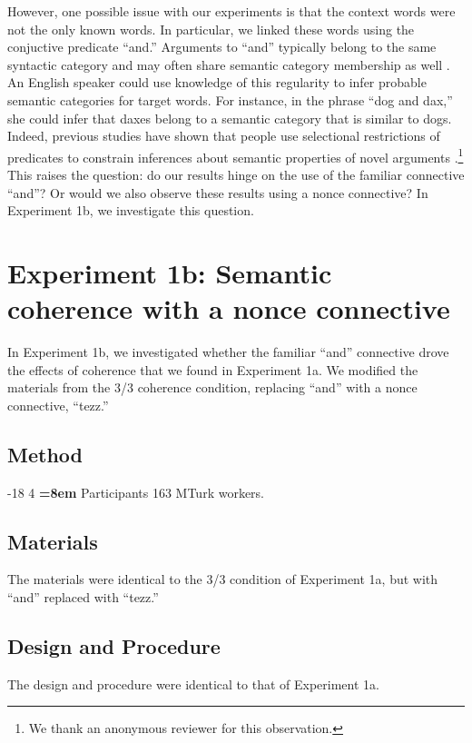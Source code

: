 \documentclass[man,longtable,floatsintext]{my-apa6}
\makeatletter
\renewcommand\subsubsection{\@startsection{subsubsection}{3}{\z@}%
                       {-18\p@ \@plus -4\p@ \@minus -4\p@}%
                       {4\p@ \@plus 2\p@ \@minus 2\p@}%
                       {\normalfont\normalsize\bfseries\boldmath
                        \rightskip=\z@ \@plus 8em\pretolerance=10000 }}
\makeatother
\begin{document}
However, one possible issue with our experiments is that the context words were not the only known words.
In particular, we linked these words using the conjuctive predicate ``and.''
Arguments to ``and'' typically belong to the same syntactic category and may often share semantic category membership as well \cite{benor2006}.
An English speaker could use knowledge of this regularity to infer probable semantic categories for target words.
For instance, in the phrase ``dog and dax,'' she could infer that daxes belong to a semantic category that is similar to dogs.
Indeed, previous studies have shown that people use selectional restrictions of predicates to constrain inferences about semantic properties of novel arguments \citep{altmann1999, kohne2010}.\footnote{We thank an anonymous reviewer for this observation.}
This raises the question: do our results hinge on the use of the familiar connective ``and''?
Or would we also observe these results using a nonce connective?
In Experiment 1b, we investigate this question.

\section{Experiment 1b: Semantic coherence with a nonce connective}

In Experiment 1b, we investigated whether the familiar ``and'' connective drove the effects of coherence that we found in Experiment 1a. We modified the materials from the 3/3 coherence condition, replacing ``and'' with a nonce connective, ``tezz.''

\subsection{Method}

\subsubsection{Participants}
163 MTurk workers.

\subsection{Materials}
The materials were identical to the 3/3 condition of Experiment 1a, but with ``and'' replaced with ``tezz.''

\subsection{Design and Procedure}
The design and procedure were identical to that of Experiment 1a.
\end{document}
